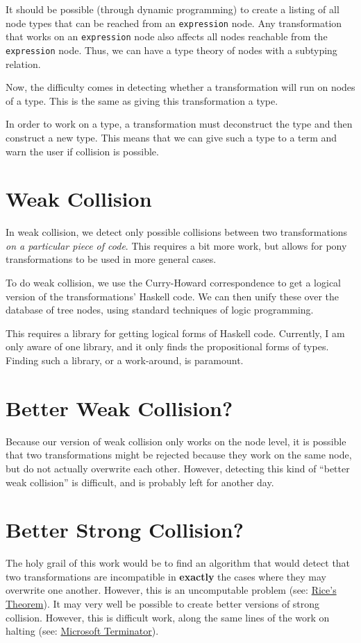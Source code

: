 \documentclass[11pt]{article}
\begin{document}
It should be possible (through dynamic programming) to create a listing of all node types that can be reached from an \verb~expression~ node. Any transformation that works on an \verb~expression~ node also affects all nodes reachable from the \verb~expression~ node. Thus, we can have a type theory of nodes with a subtyping relation.

Now, the difficulty comes in detecting whether a transformation will run on nodes of a type. This is the same as giving this transformation a type. 

In order to work on a type, a transformation must deconstruct the type and then construct a new type. This means that we can give such a type to a term and warn the user if collision is possible.
\section{Weak Collision}
\label{sec-3}


In weak collision, we detect only possible collisions between two transformations \emph{on a particular piece of code}. This requires a bit more work, but allows for pony transformations to be used in more general cases.

To do weak collision, we use the Curry-Howard correspondence to get a logical version of the transformations' Haskell code. We can then unify these over the database of tree nodes, using standard techniques of logic programming. 

This requires a library for getting logical forms of Haskell code. Currently, I am only aware of one library, and it only finds the propositional forms of types. Finding such a library, or a work-around, is paramount.
\section{Better Weak Collision?}
\label{sec-4}


Because our version of weak collision only works on the node level, it is possible that two transformations might be rejected because they work on the same node, but do not actually overwrite each other. However, detecting this kind of ``better weak collision'' is difficult, and is probably left for another day.
\section{Better Strong Collision?}
\label{sec-5}


The holy grail of this work would be to find an algorithm that would detect that two transformations are incompatible in \textbf{exactly} the cases where they may overwrite one another. However, this is an uncomputable problem (see: \href{http://en.wikipedia.org/wiki/Rice's_theorem}{Rice's Theorem}). It may very well be possible to create better versions of strong collision. However, this is difficult work, along the same lines of the work on halting (see: \href{http://research.microsoft.com/en-us/um/cambridge/projects/terminator/}{Microsoft Terminator}).
\end{document}
